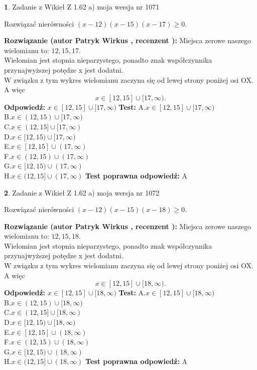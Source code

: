 \documentclass[12pt, a4paper]{article}
\theoremstyle{definition} %
\newtheorem{zad}{}
\newcommand{\zadStart}[1]{\begin{zad}#1\newline}
\newcommand{\zadStop}{\end{zad}}
\newcommand{\rozwStart}[2]{\noindent \textbf{Rozwiązanie (autor #1 , recenzent #2): }\newline}
\newcommand{\rozwStop}{\newline}
\newcommand{\odpStart}{\noindent \textbf{Odpowiedź:}\newline}
\newcommand{\odpStop}{\newline}
\newcommand{\testStart}{\noindent \textbf{Test:}\newline}
\newcommand{\testStop}{\newline}
\newcommand{\kluczStart}{\noindent \textbf{Test poprawna odpowiedź:}\newline}
\newcommand{\kluczStop}{\newline}
\begin{document}
\zadStart{Zadanie z Wikieł Z 1.62 a) moja wersja nr 1071}

Rozwiązać nierówności $(x-12)(x-15)(x-17)\ge0$.
\zadStop
\rozwStart{Patryk Wirkus}{}
Miejsca zerowe naszego wielomianu to: $12, 15, 17$.\\
Wielomian jest stopnia nieparzystego, ponadto znak współczynnika przy\linebreak najwyższej potędze x jest dodatni.\\ W związku z tym wykres wielomianu zaczyna się od lewej strony poniżej osi OX. A więc $$x \in [12,15] \cup [17,\infty).$$
\rozwStop
\odpStart
$x \in [12,15] \cup [17,\infty)$
\odpStop
\testStart
A.$x \in [12,15] \cup [17,\infty)$\\
B.$x \in (12,15) \cup [17,\infty)$\\
C.$x \in (12,15] \cup [17,\infty)$\\
D.$x \in [12,15) \cup [17,\infty)$\\
E.$x \in [12,15] \cup (17,\infty)$\\
F.$x \in (12,15) \cup (17,\infty)$\\
G.$x \in [12,15) \cup (17,\infty)$\\
H.$x \in (12,15] \cup (17,\infty)$
\testStop
\kluczStart
A
\kluczStop



\zadStart{Zadanie z Wikieł Z 1.62 a) moja wersja nr 1072}

Rozwiązać nierówności $(x-12)(x-15)(x-18)\ge0$.
\zadStop
\rozwStart{Patryk Wirkus}{}
Miejsca zerowe naszego wielomianu to: $12, 15, 18$.\\
Wielomian jest stopnia nieparzystego, ponadto znak współczynnika przy\linebreak najwyższej potędze x jest dodatni.\\ W związku z tym wykres wielomianu zaczyna się od lewej strony poniżej osi OX. A więc $$x \in [12,15] \cup [18,\infty).$$
\rozwStop
\odpStart
$x \in [12,15] \cup [18,\infty)$
\odpStop
\testStart
A.$x \in [12,15] \cup [18,\infty)$\\
B.$x \in (12,15) \cup [18,\infty)$\\
C.$x \in (12,15] \cup [18,\infty)$\\
D.$x \in [12,15) \cup [18,\infty)$\\
E.$x \in [12,15] \cup (18,\infty)$\\
F.$x \in (12,15) \cup (18,\infty)$\\
G.$x \in [12,15) \cup (18,\infty)$\\
H.$x \in (12,15] \cup (18,\infty)$
\testStop
\kluczStart
A
\kluczStop
\end{document}
